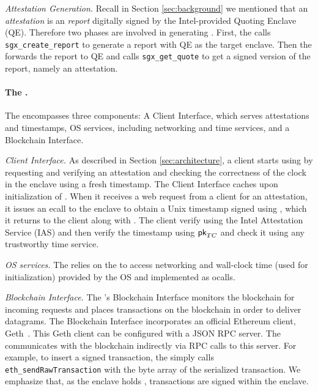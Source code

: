 \noindent\emph{Attestation Generation.} Recall in Section \ref{sec:background}
we mentioned that an \emph{attestation} is an \emph{report} digitally signed by
the Intel-provided Quoting Enclave (QE).  Therefore two phases are involved in
generating \att. First, the \encname calls \linebreak \texttt{sgx\_create\_report} to
generate a report with QE as the target enclave. Then the \medname forwards the
report to QE and calls \texttt{sgx\_get\_quote} to get a signed version of the
report, namely an attestation.

\paragraph{The \medname.} The \medname encompasses three components: A Client Interface, which serves attestations and timestamps, OS services, including networking and time services, and a Blockchain Interface. 

\vspace{2mm}

\noindent\emph{Client Interface.} As described in Section \ref{sec:architecture},
a client starts using \tc by requesting and verifying an attestation \att and checking the correctness of the clock in the \tc enclave using a fresh timestamp.
The Client Interface caches \att upon initialization of \engine. When it receives a web request from a client for an attestation,
it issues an ecall to the enclave to obtain a
Unix timestamp signed using \skTC, which it returns to the client along with \att. The client verify \att 
using the Intel Attestation Service (IAS) and then verify the timestamp using ${\sf pk}_{TC}$ and check it using any trustworthy time service. 

\vspace{2mm}

\noindent\emph{OS services.} The \encname relies on the \medname to access networking and 
wall-clock time (used for initialization) provided by the OS and implemented as ocalls.

\vspace{2mm}

\noindent\emph{Blockchain Interface.} The \medname's Blockchain Interface monitors the
blockchain for incoming requests and places transactions on the blockchain in order to
deliver datagrams. The Blockchain Interface incorporates an 
official Ethereum client, Geth~\cite{geth}. This Geth client can be configured with a JSON RPC server.  
The \medname  communicates with the blockchain indirectly via RPC calls to this server. For example, to insert a signed transaction, the \medname simply calls
\texttt{eth\_sendRawTransaction} with the byte array of the serialized
transaction. We emphasize that, as the enclave holds \skTC, transactions are signed within the enclave.


